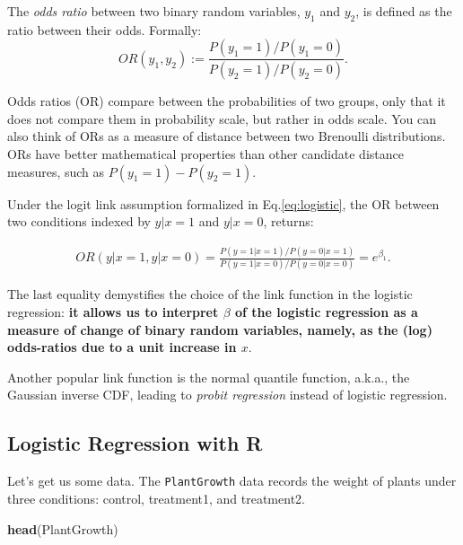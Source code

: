 \documentclass[]{book}
\newenvironment{Shaded}{\begin{snugshade}}{\end{snugshade}}
\newcommand{\KeywordTok}[1]{\textcolor[rgb]{0.13,0.29,0.53}{\textbf{#1}}}
\newcommand{\NormalTok}[1]{#1}
\theoremstyle{definition}
\theoremstyle{definition}
\theoremstyle{definition}
\theoremstyle{remark}
\let\BeginKnitrBlock\begin \let\EndKnitrBlock\end
\begin{document}
\BeginKnitrBlock{definition}[Odds Ratio]
\protect\hypertarget{def:unnamed-chunk-165}{}{\label{def:unnamed-chunk-165}
{} }The \emph{odds ratio} between two binary
random variables, \(y_1\) and \(y_2\), is defined as the ratio between
their odds. Formally:
\[OR(y_1,y_2):=\frac{P(y_1=1)/P(y_1=0)}{P(y_2=1)/P(y_2=0)}.\]
\EndKnitrBlock{definition}

Odds ratios (OR) compare between the probabilities of two groups, only
that it does not compare them in probability scale, but rather in odds
scale. You can also think of ORs as a measure of distance between two
Brenoulli distributions. ORs have better mathematical properties than
other candidate distance measures, such as \(P(y_1=1)-P(y_2=1)\).

Under the logit link assumption formalized in Eq.\eqref{eq:logistic}, the
OR between two conditions indexed by \(y|x=1\) and \(y|x=0\), returns:

\begin{align}
   OR(y|x=1,y|x=0) 
   = \frac{P(y=1|x=1)/P(y=0|x=1)}{P(y=1|x=0)/P(y=0|x=0)} 
   = e^{\beta_1}.  
\end{align}

The last equality demystifies the choice of the link function in the
logistic regression: \textbf{it allows us to interpret \(\beta\) of the
logistic regression as a measure of change of binary random variables,
namely, as the (log) odds-ratios due to a unit increase in \(x\)}.

\BeginKnitrBlock{remark}
{}Another popular link function is the normal
quantile function, a.k.a., the Gaussian inverse CDF, leading to
\emph{probit regression} instead of logistic regression.
\EndKnitrBlock{remark}

\subsection{Logistic Regression with
R}\label{logistic-regression-with-r}

Let's get us some data. The \texttt{PlantGrowth} data records the weight
of plants under three conditions: control, treatment1, and treatment2.

\begin{Shaded}
\begin{Highlighting}[]
\KeywordTok{head}\NormalTok{(PlantGrowth)}
\end{Highlighting}
\end{Shaded}
\end{document}
